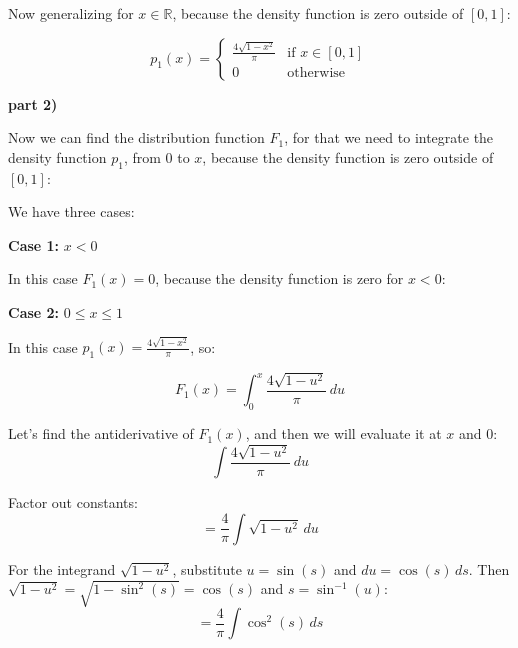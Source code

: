 \singlespacing

Now generalizing for $x \in \mathbb{R}$, because the density function is zero outside of $[0, 1]$:

\singlespacing

\begin{equation}
    p_1(x) = \begin{cases}
        \frac{4\sqrt{1 - x^2}}{\pi} & \text{if } x \in [0, 1] \\
        0                           & \text{otherwise}
    \end{cases}
\end{equation}


\singlespacing
\textbf{part 2)}
\singlespacing

Now we can find the distribution function $F_1$, for that we need to integrate the density function $p_1$,
from $0$ to $x$, because the density function is zero outside of $[0, 1]$:

\singlespacing

We have three cases:

\singlespacing

\textbf{Case 1:} $x < 0$

\singlespacing

In this case $F_1(x) = 0$, because the density function is zero for $x < 0$:
\singlespacing

\textbf{Case 2:} $0 \leq x \leq 1$

\singlespacing

In this case $p_1(x) = \frac{4\sqrt{1 - x^2}}{\pi}$, so:

\singlespacing

\begin{equation}
    F_1(x) = \int_{0}^{x} \frac{4\sqrt{1 - u^2}}{\pi} \, du
\end{equation}

\singlespacing
Let's find the antiderivative of $F_1(x)$, and then we will evaluate it at $x$ and $0$:
\singlespacing
\begin{equation}
    \int \frac{4 \sqrt{1 - u^2}}{\pi} \, du
\end{equation}

\singlespacing
Factor out constants:
\singlespacing
\begin{equation}
    = \frac{4}{\pi} \int \sqrt{1 - u^2} \, du
\end{equation}

\singlespacing
For the integrand \(\sqrt{1 - u^2}\), substitute \(u = \sin(s)\) and \(du = \cos(s) \, ds\). Then \(\sqrt{1 - u^2} = \sqrt{1 - \sin^2(s)} = \cos(s)\) and \(s = \sin^{-1}(u)\):
\singlespacing
\begin{equation}
    = \frac{4}{\pi} \int \cos^2(s) \, ds
\end{equation}

